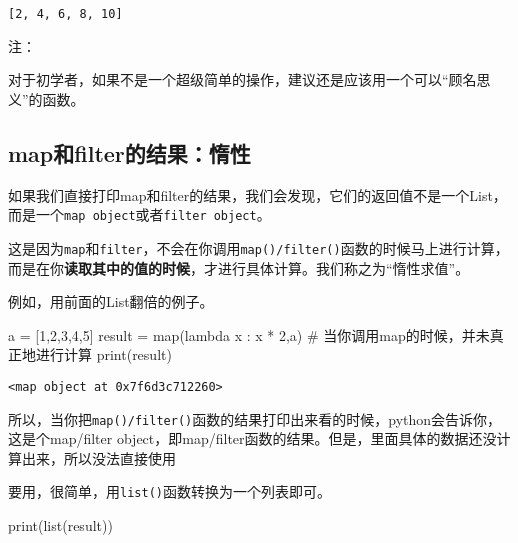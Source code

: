 \documentclass[
  letterpaper,
  DIV=11,
  numbers=noendperiod]{scrreprt}
\newenvironment{Shaded}{\begin{snugshade}}{\end{snugshade}}
\newcommand{\BuiltInTok}[1]{\textcolor[rgb]{0.00,0.23,0.31}{#1}}
\newcommand{\CommentTok}[1]{\textcolor[rgb]{0.37,0.37,0.37}{#1}}
\newcommand{\DecValTok}[1]{\textcolor[rgb]{0.68,0.00,0.00}{#1}}
\newcommand{\KeywordTok}[1]{\textcolor[rgb]{0.00,0.23,0.31}{#1}}
\newcommand{\NormalTok}[1]{\textcolor[rgb]{0.00,0.23,0.31}{#1}}
\newcommand{\OperatorTok}[1]{\textcolor[rgb]{0.37,0.37,0.37}{#1}}
\begin{document}
\begin{verbatim}
[2, 4, 6, 8, 10]
\end{verbatim}

注：

对于初学者，如果不是一个超级简单的操作，建议还是应该用一个可以``顾名思义''的函数。

\hypertarget{mapux548cfilterux7684ux7ed3ux679cux60f0ux6027}{%
\subsection{map和filter的结果：惰性}\label{mapux548cfilterux7684ux7ed3ux679cux60f0ux6027}}

如果我们直接打印map和filter的结果，我们会发现，它们的返回值不是一个List，而是一个\texttt{map\ object}或者\texttt{filter\ object}。

这是因为\texttt{map}和\texttt{filter}，不会在你调用\texttt{map()/filter()}函数的时候马上进行计算，而是在你\textbf{读取其中的值的时候}，才进行具体计算。我们称之为``惰性求值''。

例如，用前面的List翻倍的例子。

\begin{Shaded}
\begin{Highlighting}[]
\NormalTok{a }\OperatorTok{=}\NormalTok{ [}\DecValTok{1}\NormalTok{,}\DecValTok{2}\NormalTok{,}\DecValTok{3}\NormalTok{,}\DecValTok{4}\NormalTok{,}\DecValTok{5}\NormalTok{]}
\NormalTok{result }\OperatorTok{=} \BuiltInTok{map}\NormalTok{(}\KeywordTok{lambda}\NormalTok{ x : x }\OperatorTok{*} \DecValTok{2}\NormalTok{,a) }\CommentTok{\# 当你调用map的时候，并未真正地进行计算}
\BuiltInTok{print}\NormalTok{(result)}
\end{Highlighting}
\end{Shaded}

\begin{verbatim}
<map object at 0x7f6d3c712260>
\end{verbatim}

所以，当你把\texttt{map()/filter()}函数的结果打印出来看的时候，python会告诉你，这是个map/filter
object，即map/filter函数的结果。但是，里面具体的数据还没计算出来，所以没法直接使用

要用，很简单，用\texttt{list()}函数转换为一个列表即可。

\begin{Shaded}
\begin{Highlighting}[]
\BuiltInTok{print}\NormalTok{(}\BuiltInTok{list}\NormalTok{(result))}
\end{Highlighting}
\end{Shaded}
\end{document}

